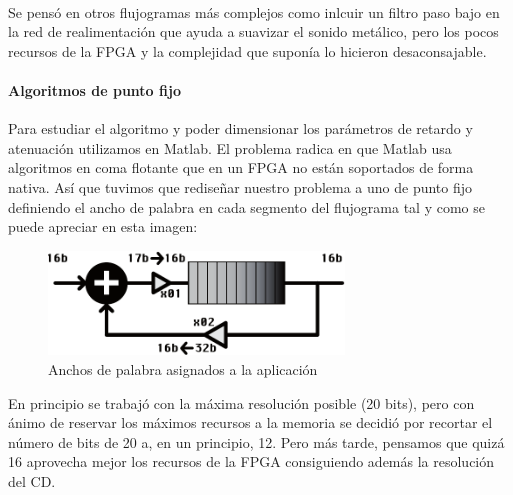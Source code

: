 \paragraph{} Se pensó en otros flujogramas más complejos como inlcuir un filtro paso bajo en la red de realimentación que ayuda a suavizar el sonido metálico, pero los pocos recursos de la FPGA y la complejidad que suponía lo hicieron desaconsajable.
\paragraph{Algoritmos de punto fijo} Para estudiar el algoritmo y poder dimensionar los parámetros de retardo y atenuación utilizamos en Matlab. El problema radica en que Matlab usa algoritmos en coma flotante que en un FPGA no están soportados de forma nativa. Así que tuvimos que rediseñar nuestro problema a uno de punto fijo definiendo el ancho de palabra en cada segmento del flujograma tal y como se puede apreciar en esta imagen:

\begin{figure}[h]
\begin{center}
	\includegraphics[width=0.7\textwidth]{./reverb_implemented_diagram-eps-converted-to}
\caption{Anchos de palabra asignados a la aplicación}
\label{default}
\end{center}
\end{figure}

	En principio se trabajó con la máxima resolución posible (20 bits), pero con ánimo de reservar los máximos recursos a la memoria se decidió por recortar el número de bits de 20 a, en un principio, 12. Pero más tarde, pensamos que quizá 16 aprovecha mejor los recursos de la FPGA consiguiendo además la resolución del CD.
	
